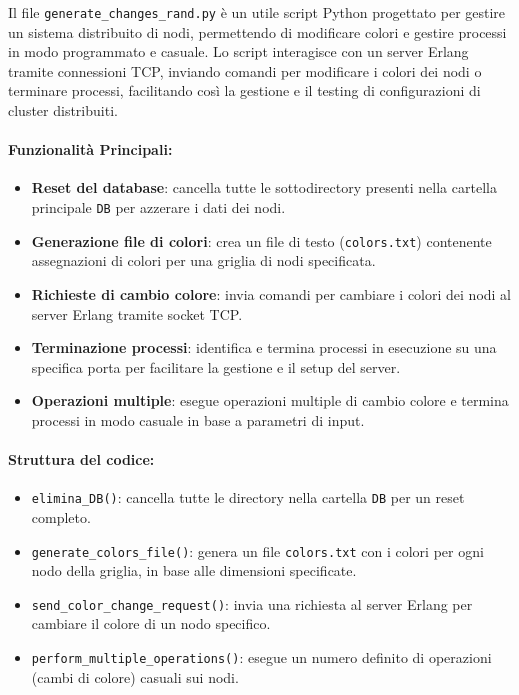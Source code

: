 \documentclass[12pt, a4paper]{report}
\begin{document}
Il file \texttt{generate\_changes\_rand.py} è un utile script Python progettato per gestire un sistema distribuito di nodi, permettendo di modificare colori e gestire processi in modo programmato e casuale. Lo script interagisce con un server Erlang tramite connessioni TCP, inviando comandi per modificare i colori dei nodi o terminare processi, facilitando così la gestione e il testing di configurazioni di cluster distribuiti.

\paragraph{Funzionalità Principali:}
\begin{itemize}
    \item \textbf{Reset del database}: cancella tutte le sottodirectory presenti nella cartella principale \texttt{DB} per azzerare i dati dei nodi.
    \item \textbf{Generazione file di colori}: crea un file di testo (\texttt{colors.txt}) contenente assegnazioni di colori per una griglia di nodi specificata.
    \item \textbf{Richieste di cambio colore}: invia comandi per cambiare i colori dei nodi al server Erlang tramite socket TCP.
    \item \textbf{Terminazione processi}: identifica e termina processi in esecuzione su una specifica porta per facilitare la gestione e il setup del server.
    \item \textbf{Operazioni multiple}: esegue operazioni multiple di cambio colore e termina processi in modo casuale in base a parametri di input.
\end{itemize}

\paragraph{Struttura del codice:}
\begin{itemize}
    \item \texttt{elimina\_DB()}: cancella tutte le directory nella cartella \texttt{DB} per un reset completo.
    \item \texttt{generate\_colors\_file()}: genera un file \texttt{colors.txt} con i colori per ogni nodo della griglia, in base alle dimensioni specificate.
    \item \texttt{send\_color\_change\_request()}: invia una richiesta al server Erlang per cambiare il colore di un nodo specifico.
    \item \texttt{perform\_multiple\_operations()}: esegue un numero definito di operazioni (cambi di colore) casuali sui nodi.
\end{itemize}
\end{document}
